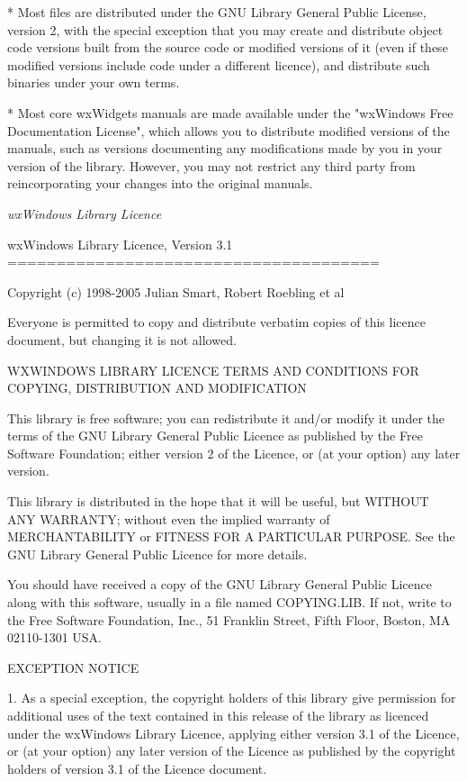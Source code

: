 * Most files are distributed under the GNU Library General Public License,
version 2, with the special exception that you may create and distribute
object code versions built from the source code or modified versions of it
(even if these modified versions include code under a different licence),
and distribute such binaries under your own terms.

* Most core wxWidgets manuals are made available under the "wxWindows Free
Documentation License", which allows you to distribute modified versions of
the manuals, such as versions documenting any modifications made by you in
your version of the library. However, you may not restrict any third party
from reincorporating your changes into the original manuals.

\textit{wxWindows Library Licence}

\begin{center}
wxWindows Library Licence, Version 3.1
======================================
\end{center}

Copyright (c) 1998-2005 Julian Smart, Robert Roebling et al

Everyone is permitted to copy and distribute verbatim copies
of this licence document, but changing it is not allowed.

\begin{center}
WXWINDOWS LIBRARY LICENCE
TERMS AND CONDITIONS FOR COPYING, DISTRIBUTION AND MODIFICATION
\end{center}

This library is free software; you can redistribute it and/or modify it
under the terms of the GNU Library General Public Licence as published by
the Free Software Foundation; either version 2 of the Licence, or (at your
option) any later version.

This library is distributed in the hope that it will be useful, but WITHOUT
ANY WARRANTY; without even the implied warranty of MERCHANTABILITY or
FITNESS FOR A PARTICULAR PURPOSE.  See the GNU Library General Public
Licence for more details.

You should have received a copy of the GNU Library General Public Licence
along with this software, usually in a file named COPYING.LIB.  If not,
write to the Free Software Foundation, Inc., 51 Franklin Street, Fifth
Floor, Boston, MA 02110-1301 USA.

EXCEPTION NOTICE

1. As a special exception, the copyright holders of this library give
permission for additional uses of the text contained in this release of the
library as licenced under the wxWindows Library Licence, applying either
version 3.1 of the Licence, or (at your option) any later version of the
Licence as published by the copyright holders of version 3.1 of the Licence
document.

